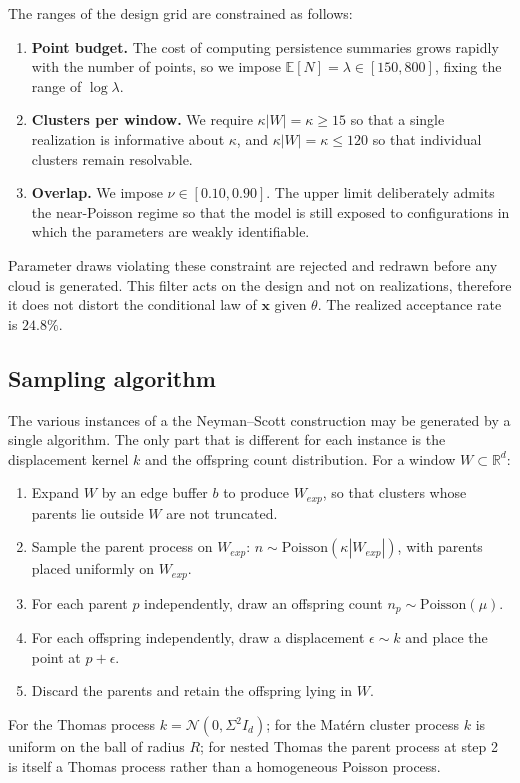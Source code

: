 \documentclass[11pt,letterpaper]{article}
\newcommand{\R}{\mathbb{R}}
\newcommand{\1}{\mathds{1}}
\newcommand{\pc}{\mathbf{x}}
\newcommand{\simpcom}{\Sigma}
\theoremstyle{plain}
\theoremstyle{definitioncolon}
\begin{document}
The ranges of the design grid are constrained as follows:
    \begin{enumerate}
        \item \textbf{Point budget.} The cost of computing persistence summaries
        grows rapidly with the number of points, so we impose
        $\mathbb{E}[N] = \lambda \in [150, 800]$, fixing the range of
        $\log\lambda$.
        \item \textbf{Clusters per window.} We require $\kappa|W| = \kappa \geq 15$
        so that a single realization is informative about $\kappa$, and
        $\kappa|W| = \kappa \leq 120$ so that individual clusters remain
        resolvable.
        \item \textbf{Overlap.} We impose $\nu \in [0.10, 0.90]$. The upper
        limit deliberately admits the near-Poisson regime so that the model is
        still exposed to configurations in which the parameters are weakly
        identifiable.
    \end{enumerate}
Parameter draws violating these constraint are rejected and redrawn before any
cloud is generated. This filter acts on the design and not on realizations,
therefore it does not distort the conditional law of $\pc$ given $\theta$. The
realized acceptance rate is $24.8\%$.

\subsection{Sampling algorithm}

The various instances of a the Neyman--Scott construction may be generated by a
single algorithm. The only part that is different for each instance is the
displacement kernel $k$ and the offspring count distribution. For a window
$W \subset \R^d$:
    \begin{enumerate}
        \item Expand $W$ by an edge buffer $b$ to produce $W_{exp}$, so that
        clusters whose parents lie outside $W$ are not truncated.
        \item Sample the parent process on $W_{exp}$:
        $n \sim \mathrm{Poisson}(\kappa|W_{exp}|)$, with parents placed uniformly
        on $W_{exp}$.
        \item For each parent $p$ independently, draw an offspring count
        $n_p \sim \mathrm{Poisson}(\mu)$.
        \item For each offspring independently, draw a displacement
        $\epsilon \sim k$ and place the point at $p + \epsilon$.
        \item Discard the parents and retain the offspring lying in $W$.
    \end{enumerate}
For the Thomas process $k = \mathcal{N}(0, \simpcom^2 I_d)$; for the Mat\'ern
cluster process $k$ is uniform on the ball of radius $R$; for nested Thomas the
parent process at step 2 is itself a Thomas process rather than a homogeneous
Poisson process.
\end{document}
